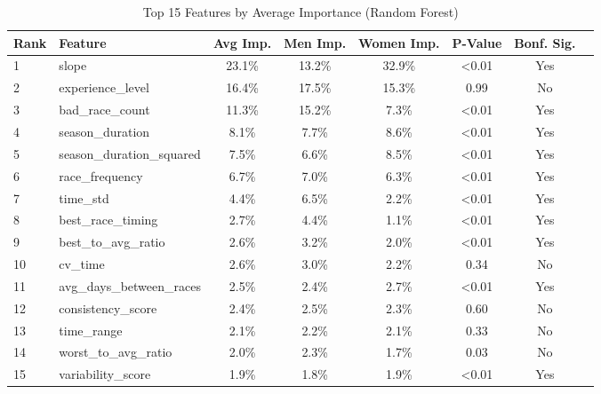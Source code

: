 \documentclass[suppldata]{interact}
\theoremstyle{plain}%
\theoremstyle{definition}
\theoremstyle{remark}
\begin{document}
\begin{table}[h]
\centering
\begin{adjustbox}{max width=\linewidth}
\begin{tabular}{llcccccc}
\toprule
 Rank &Feature & Avg Imp. & Men Imp. & Women Imp. & P-Value & Bonf. Sig. \\
\midrule
 1 &slope &  23.1\% & 13.2\% & 32.9\% & \textless{}0.01 & Yes \\
 2 &experience\_level & 16.4\% & 17.5\% & 15.3\% & 0.99 & No \\
 3 &bad\_race\_count & 11.3\% & 15.2\% & 7.3\% & \textless{}0.01 & Yes \\
 4 &season\_duration & 8.1\% & 7.7\% & 8.6\% & \textless{}0.01 & Yes \\
 5 &season\_duration\_squared & 7.5\% & 6.6\% & 8.5\% & \textless{}0.01 & Yes \\
 6 &race\_frequency & 6.7\% & 7.0\% & 6.3\% & \textless{}0.01 & Yes \\
 7 &time\_std & 4.4\% & 6.5\% & 2.2\% & \textless{}0.01 & Yes \\
 8 &best\_race\_timing & 2.7\% & 4.4\% & 1.1\% & \textless{}0.01 & Yes \\
 9 &best\_to\_avg\_ratio & 2.6\% & 3.2\% & 2.0\% & \textless{}0.01 & Yes \\
 10 &cv\_time & 2.6\% & 3.0\% & 2.2\% & 0.34 & No \\
 11 &avg\_days\_between\_races & 2.5\% & 2.4\% & 2.7\% & \textless{}0.01 & Yes \\
 12 &consistency\_score & 2.4\% & 2.5\% & 2.3\% & 0.60 & No \\
 13 &time\_range & 2.1\% & 2.2\% & 2.1\% & 0.33 & No \\
 14 &worst\_to\_avg\_ratio & 2.0\% & 2.3\% & 1.7\% & 0.03 & No \\
 15 &variability\_score & 1.9\% & 1.8\% & 1.9\% & \textless{}0.01 & Yes \\
\bottomrule
\end{tabular}
\end{adjustbox}
\caption{Top 15 Features by Average Importance (Random Forest)}
\label{tab:gender_feature_importance}
\end{table}
\end{document}
